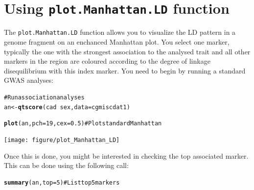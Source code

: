 \documentclass{article}\usepackage{graphicx, color}
\makeatletter
\newcommand{\hlfunctioncall}[1]{\textcolor[rgb]{0.501960784313725,0,0.329411764705882}{\textbf{#1}}}%
\newcommand{\hlcomment}[1]{\textcolor[rgb]{0.180392156862745,0.6,0.341176470588235}{#1}}%
\newenvironment{kframe}{%
 \def\at@end@of@kframe{}%
 \ifinner\ifhmode%
  \def\at@end@of@kframe{\end{minipage}}%
  \begin{minipage}{\columnwidth}%
 \fi\fi%
 \def\FrameCommand##1{\hskip\@totalleftmargin \hskip-\fboxsep
 \colorbox{shadecolor}{##1}\hskip-\fboxsep
     \hskip-\linewidth \hskip-\@totalleftmargin \hskip\columnwidth}%
 \MakeFramed {\advance\hsize-\width
   \@totalleftmargin\z@ \linewidth\hsize
   \@setminipage}}%
 {\par\unskip\endMakeFramed%
 \at@end@of@kframe}
\newenvironment{knitrout}{}{} %
\makeatother
\begin{document}
\section{Using {\tt plot.Manhattan.LD} function}
The {\tt plot.Manhattan.LD} function allows you to visualize the LD pattern in a genome fragment on an enchanced Manhattan plot. You select one marker, typically the one with the strongest association to the analysed trait and all other markers in the region are coloured according to the degree of linkage disequilibrium with this index marker. You need to begin by running a standard GWAS analyses:
\begin{knitrout}
\color{fgcolor}\begin{kframe}
\begin{alltt}
\hlcomment{# Run association analyses}
an <- \hlfunctioncall{qtscore}(cad ~ sex, data = cgmiscdat1)
\end{alltt}


{\ttfamily\noindent\color{warningcolor}{\#\# Warning: binomial trait is analysed as gaussian}}

{\ttfamily\noindent\color{warningcolor}{\#\# Warning: 27 observations deleted due to missingness}}\begin{alltt}
\hlfunctioncall{plot}(an, pch = 19, cex = 0.5)  \hlcomment{# Plot standard Manhattan}
\end{alltt}
\end{kframe}

{\centering \texttt{[image: figure/plot\_Manhattan\_LD]} 

}



\end{knitrout}

Once this is done, you might be interested in checking the top associated marker. This can be done using the following call:
\begin{knitrout}
\color{fgcolor}\begin{kframe}
\begin{alltt}
\hlfunctioncall{summary}(an, top = 5)  \hlcomment{# List top 5 markers}
\end{alltt}
\end{kframe}
\end{knitrout}
\end{document}
